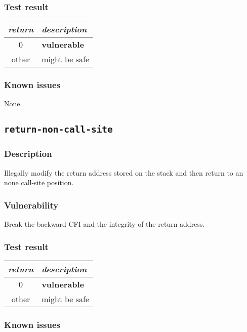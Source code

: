 \documentclass[a4paper]{book}
\begin{document}
\subsubsection{Test result}
\begin{tabular}{cl}
  \toprule
  \emph{return}  & \emph{description} \\
  \midrule
  0              & \textbf{vulnerable} \\
  other          & might be safe \\
  \bottomrule
\end{tabular}
  
\subsubsection{Known issues}

None.

\newpage
\subsection{\texttt{return-non-call-site}}\label{test-return-non-call-site}

\subsubsection{Description}
Illegally modify the return address stored on the stack and then return to an none call-site position.

\subsubsection{Vulnerability}
Break the backward CFI and the integrity of the return address.

\subsubsection{Test result}
\begin{tabular}{cl}
  \toprule
  \emph{return}  & \emph{description} \\
  \midrule
  0              & \textbf{vulnerable} \\
  other          & might be safe \\
  \bottomrule
\end{tabular}
  
\subsubsection{Known issues}
\end{document}
